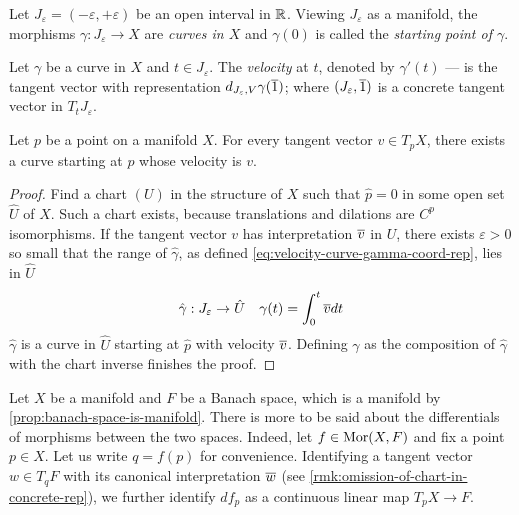 \documentclass[../main-manifolds.tex]{subfiles}
\begin{document}
Let $J_\varepsilon = (-\varepsilon, +\varepsilon)$ be an open interval in $\mathbb{R}$. Viewing $J_\varepsilon$ as a manifold, the morphisms $\gamma: J_\varepsilon\to X$ are \emph{curves in $X$} and $\gamma(0)$ is called the \emph{starting point of $\gamma$}.
\begin{definition}\label{def:velocity-of-a-curve}
    Let $\gamma$ be a curve in $X$ and $t\in J_\varepsilon$. The \emph{velocity} at $t$, denoted by $\gamma'(t)$ --- is the tangent vector with representation $d_{J_\varepsilon,V}\gamma(\overline{1})$; where $(J_\varepsilon,\overline{1})$ is a concrete tangent vector in $T_t J_\varepsilon$.
\end{definition}
\begin{wts}\label{prop:tangent-vectors-are-velocities}
    Let $p$ be a point on a manifold $X$. For every tangent vector $v\in T_p X$, there exists a curve starting at $p$ whose velocity is $v$.
\end{wts}
\begin{proof}
    Find a chart $(U)$ in the structure of $X$ such that $\hat{p}=0$ in some open set $\hat{U}$ of $X$. Such a chart exists, because translations and dilations are $C^p$ isomorphisms. If the tangent vector $v$ has interpretation $\overline{v}$ in $U$, there exists $\varepsilon>0$ so small that the range of $\hat{\gamma}$, as defined \cref{eq:velocity-curve-gamma-coord-rep}, lies in $\hat{U}$
    \begin{equation}\label{eq:velocity-curve-gamma-coord-rep}
        \hat{\gamma}: J_\varepsilon\to \hat{U}\quad \gamma(t) = \int_0^t \overline{v}dt
    \end{equation}
    $\hat{\gamma}$ is a curve in $\hat{U}$ starting at $\hat{p}$ with velocity $\overline{v}$. Defining $\gamma$ as the composition of $\hat{\gamma}$ with the chart inverse finishes the proof.
\end{proof}

Let $X$ be a manifold and $F$ be a Banach space, which is a manifold by \cref{prop:banach-space-is-manifold}. There is more to be said about the differentials of morphisms between the two spaces. Indeed, let $f\in \operatorname{Mor}(X,F)$ and fix a point $p\in X$. Let us write $q = f(p)$ for convenience. Identifying a tangent vector $w\in T_q F$ with its canonical interpretation $\overline{w}$ (see \cref{rmk:omission-of-chart-in-concrete-rep}), we further identify $df_p$ as a continuous linear map $T_p X\to F$.\\
\end{document}
